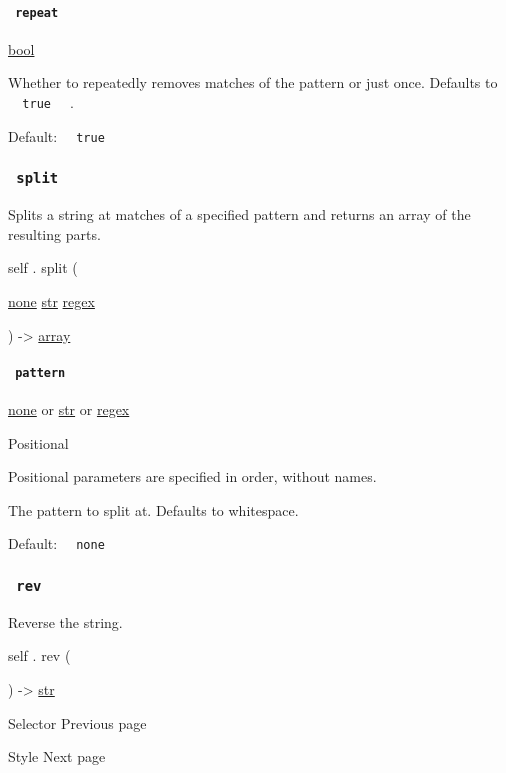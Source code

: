 \paragraph{\texorpdfstring{\texttt{\ repeat\ }}{ repeat }}\label{definitions-trim-repeat}

\href{/docs/reference/foundations/bool/}{bool}

Whether to repeatedly removes matches of the pattern or just once.
Defaults to \texttt{\ }{\texttt{\ true\ }}\texttt{\ } .

Default: \texttt{\ }{\texttt{\ true\ }}\texttt{\ }

\subsubsection{\texorpdfstring{\texttt{\ split\ }}{ split }}\label{definitions-split}

Splits a string at matches of a specified pattern and returns an array
of the resulting parts.

self { . } { split } (

{ \href{/docs/reference/foundations/none/}{none}
\href{/docs/reference/foundations/str/}{str}
\href{/docs/reference/foundations/regex/}{regex} }

) -\textgreater{} \href{/docs/reference/foundations/array/}{array}

\paragraph{\texorpdfstring{\texttt{\ pattern\ }}{ pattern }}\label{definitions-split-pattern}

\href{/docs/reference/foundations/none/}{none} {or}
\href{/docs/reference/foundations/str/}{str} {or}
\href{/docs/reference/foundations/regex/}{regex}

{{ Positional }}

\label{definitions-split-pattern-positional-tooltip}
Positional parameters are specified in order, without names.

The pattern to split at. Defaults to whitespace.

Default: \texttt{\ }{\texttt{\ none\ }}\texttt{\ }

\subsubsection{\texorpdfstring{\texttt{\ rev\ }}{ rev }}\label{definitions-rev}

Reverse the string.

self { . } { rev } (

) -\textgreater{} \href{/docs/reference/foundations/str/}{str}

\href{/docs/reference/foundations/selector/}{\pandocbounded{}}

{ Selector } { Previous page }

\href{/docs/reference/foundations/style/}{\pandocbounded{}}

{ Style } { Next page }
